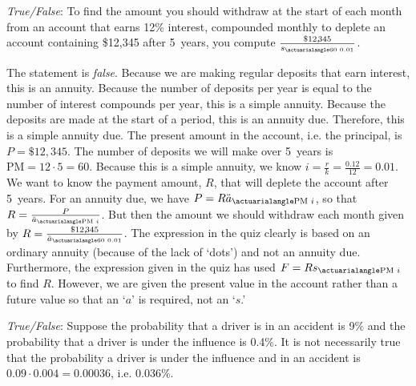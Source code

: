 \documentclass[11pt,letterpaper]{article}
\begin{document}
\quizsol \textit{True/False}: To find the amount you should withdraw at the start of each month from an account that earns 12\% interest, compounded monthly to deplete an account containing \$12,345 after 5~years, you compute $\frac{\$12,\!345}{\actS{60}{0.01}}$. \pspace

\sol The statement is \textit{false}. Because we are making regular deposits that earn interest, this is an annuity. Because the number of deposits per year is equal to the number of interest compounds per year, this is a simple annuity. Because the deposits are made at the start of a period, this is an annuity due. Therefore, this is a simple annuity due. The present amount in the account, i.e. the principal, is $P= \$12,\!345$. The number of deposits we will make over 5~years is $\text{PM}= 12 \cdot 5= 60$. Because this is a simple annuity, we know $i= \frac{r}{k}= \frac{0.12}{12}= 0.01$. We want to know the payment amount, $R$, that will deplete the account after 5~years. For an annuity due, we have $P= R \actAD{\text{PM}}{i}$, so that $R= \frac{P}{\actAD{\text{PM}}{i}}$. But then the amount we should withdraw each month given by $R= \frac{\$12,\!345}{\actAD{60}{0.01}}$. The expression in the quiz clearly is based on an ordinary annuity (because of the lack of `dots') and not an annuity due. Furthermore, the expression given in the quiz has used $F= R \actS{\text{PM}}{i}$ to find $R$. However, we are given the present value in the account rather than a future value so that an `$a$' is required, not an `$s$.' 



\quizsol \textit{True/False}: Suppose the probability that a driver is in an accident is 9\% and the probability that a driver is under the influence is 0.4\%. It is not necessarily true that the probability a driver is under the influence and in an accident is $0.09 \cdot 0.004= 0.00036$, i.e. 0.036\%. \pspace
\end{document}
